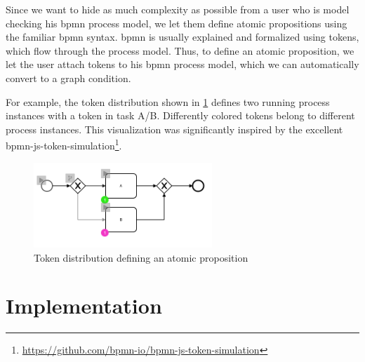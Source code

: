 \documentclass[adraft, copyright, creativecommons]{eptcs} %
\begin{document}
Since we want to hide as much complexity as possible from a user who is model checking his \gls*{bpmn} process model, we let them define atomic propositions using the familiar \gls*{bpmn} syntax.
\gls*{bpmn} is usually explained and formalized using tokens, which flow through the process model.
Thus, to define an atomic proposition, we let the user attach tokens to his \gls*{bpmn} process model, which we can automatically convert to a graph condition.

For example, the token distribution shown in \cref{fig:atomicProposition} defines two running process instances with a token in task A/B.
Differently colored tokens belong to different process instances.
This visualization was significantly inspired by the excellent bpmn-js-token-simulation\footnote{\url{https://github.com/bpmn-io/bpmn-js-token-simulation}}.

\begin{figure}[h]
    \centering
    \includegraphics[width=0.6\textwidth]{images/atomicProposition.png}
    \caption{Token distribution defining an atomic proposition}
    \label{fig:atomicProposition}
\end{figure}


\section{Implementation}
\end{document}
